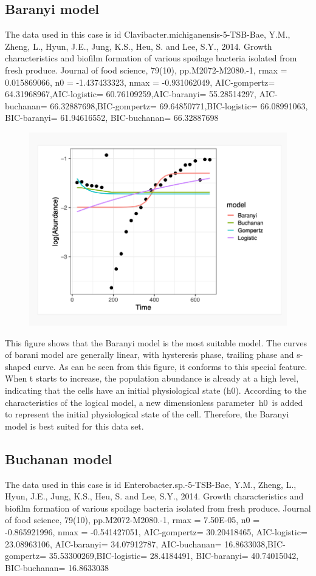 \documentclass[11pt,a4 paper,title page]{article}
\begin{document}
 \subsection{Baranyi model}
The data used in this case is id Clavibacter.michiganensis-5-TSB-Bae, Y.M., Zheng, L., Hyun, J.E., Jung, K.S., Heu, S. and Lee, S.Y., 2014. Growth characteristics and biofilm formation of various spoilage bacteria isolated from fresh produce. Journal of food science, 79(10), pp.M2072-M2080.-1, rmax = 0.015869066, n0 = -1.437433323, nmax = -0.931062049, AIC-gompertz= 64.31968967,AIC-logistic= 60.76109259,AIC-baranyi= 55.28514297, AIC-buchanan= 66.32887698,BIC-gompertz= 69.64850771,BIC-logistic= 66.08991063, BIC-baranyi= 61.94616552, BIC-buchanan= 66.32887698
\begin{figure}[H]
\centering
\includegraphics[width=.8\textwidth]{../picture/figure16.png}
\end{figure}
  \hfill\break
This figure shows that the Baranyi model is the most suitable model. The curves of barani model are generally linear, with hysteresis phase, trailing phase and s-shaped curve. As can be seen from this figure, it conforms to this special feature. When t starts to increase, the population abundance is already at a high level, indicating that the cells have an initial physiological state (h0). According to the characteristics of the logical model, a new dimensionless parameter h0 is added to represent the initial physiological state of the cell. Therefore, the Baranyi model is best suited for this data set.

 \subsection{Buchanan model}
The data used in this case is id Enterobacter.sp.-5-TSB-Bae, Y.M., Zheng, L., Hyun, J.E., Jung, K.S., Heu, S. and Lee, S.Y., 2014. Growth characteristics and biofilm formation of various spoilage bacteria isolated from fresh produce. Journal of food science, 79(10), pp.M2072-M2080.-1, rmax = 7.50E-05, n0 = -0.865921996, nmax = -0.541427051, AIC-gompertz= 30.20418465, AIC-logistic= 23.08963106, AIC-baranyi= 34.07912787, AIC-buchanan= 16.8633038,BIC-gompertz= 35.53300269,BIC-logistic= 28.4184491, BIC-baranyi= 40.74015042, BIC-buchanan= 16.8633038
\end{document}
